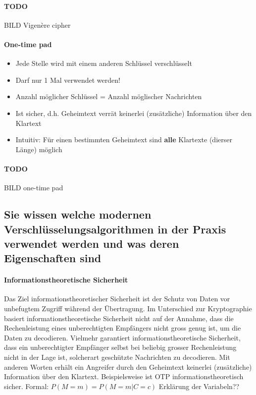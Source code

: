 \documentclass[10pt,a4paper]{article}
\begin{document}
\paragraph*{TODO}BILD Vigenère cipher
\paragraph*{One-time pad}
\begin{itemize}[noitemsep,topsep=0pt,leftmargin=*]
    \item Jede Stelle wird mit einem anderen Schlüssel verschlüsselt
    \item Darf nur 1 Mal verwendet werden!
    \item Anzahl möglicher Schlüssel = Anzahl möglischer Nachrichten
    \item Ist sicher, d.h. Geheimtext verrät keinerlei (zusätzliche) Information über den Klartext
    \item Intuitiv: Für einen bestimmten Geheimtext sind \textbf{alle} Klartexte (dierser Länge) möglich
\end{itemize}
\paragraph*{TODO}BILD one-time pad

\subsection*{Sie wissen welche modernen Verschlüsselungsalgorithmen in der Praxis verwendet werden und was deren Eigenschaften sind}
\paragraph*{Informationstheoretische Sicherheit}Das Ziel informationstheoretischer Sicherheit ist der Schutz von Daten vor unbefugtem Zugriff während der Übertragung. Im Unterschied zur Kryptographie basiert informationstheoretische Sicherheit nicht auf der Annahme, dass die Rechenleistung eines unberechtigten Empfängers nicht gross genug ist, um die Daten zu decodieren. Vielmehr garantiert informationstheoretische Sicherheit, dass ein unberechtigter Empfänger selbst bei beliebig grosser Rechenleistung nicht in der Lage ist, solcherart geschützte Nachrichten zu decodieren. Mit anderen Worten erhält ein Angreifer durch den Geheimtext keinerlei (zusätzliche) Information über den Klartext. Beispielsweise ist OTP informationstheoretisch sicher.\newline
Formal:
\begin{math}
    P(M=m) = P(M=m|C=c)
\end{math} {\color{red}Erklärung der Variabeln??}
\end{document}
